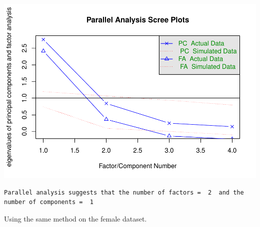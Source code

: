 \documentclass[
]{article}
\begin{document}
\includegraphics{HUDM6122-Homework_05-Chenguang-Pan_files/figure-latex/unnamed-chunk-7-1.pdf}

\begin{verbatim}
Parallel analysis suggests that the number of factors =  2  and the number of components =  1 
\end{verbatim}

Using the same method on the female dataset.
\end{document}
